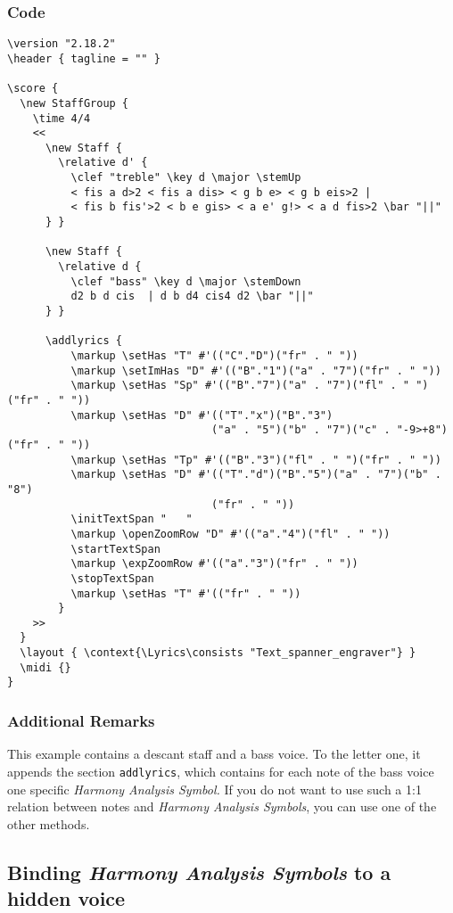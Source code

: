 \documentclass[
  DIV=calc,
  BCOR=5mm,
  12pt,
  headings=small,
  oneside,
  abstract=true,
  toc=bib,
  xcolor=dvipsnames,
  openany,
  ngerman,english]{scrartcl}
\newcommand{\has}[1]{\textit{Harmony Analysis Symbol#1}}
\begin{document}
\subsubsection{Code}

\begin{scriptsize}
\begin{verbatim}
\version "2.18.2"
\header { tagline = "" }

\score {
  \new StaffGroup {
    \time 4/4
    <<
      \new Staff {
        \relative d' {
          \clef "treble" \key d \major \stemUp
          < fis a d>2 < fis a dis> < g b e> < g b eis>2 | 
          < fis b fis'>2 < b e gis> < a e' g!> < a d fis>2 \bar "||"
      } }   

      \new Staff {
        \relative d { 
          \clef "bass" \key d \major \stemDown
          d2 b d cis  | d b d4 cis4 d2 \bar "||"
      } }   
      
      \addlyrics {
          \markup \setHas "T" #'(("C"."D")("fr" . " "))
          \markup \setImHas "D" #'(("B"."1")("a" . "7")("fr" . " "))
          \markup \setHas "Sp" #'(("B"."7")("a" . "7")("fl" . " ")("fr" . " "))
          \markup \setHas "D" #'(("T"."x")("B"."3")
                                ("a" . "5")("b" . "7")("c" . "-9>+8")("fr" . " "))
          \markup \setHas "Tp" #'(("B"."3")("fl" . " ")("fr" . " ")) 
          \markup \setHas "D" #'(("T"."d")("B"."5")("a" . "7")("b" . "8")
                                ("fr" . " "))    
          \initTextSpan "   "
          \markup \openZoomRow "D" #'(("a"."4")("fl" . " "))
          \startTextSpan
          \markup \expZoomRow #'(("a"."3")("fr" . " ")) 
          \stopTextSpan
          \markup \setHas "T" #'(("fr" . " "))
        }
    >>
  }
  \layout { \context{\Lyrics\consists "Text_spanner_engraver"} }
  \midi {}
}
\end{verbatim}
\end{scriptsize}

\subsubsection{Additional Remarks}

This example contains a descant staff and a bass voice. To the letter one, it
appends the section \texttt{addlyrics}, which contains for each note of the bass
voice one specific \has. If you do not want to use such a 1:1 relation between
notes and \has{s}, you can use one of the other methods.

\subsection{Binding \has{s} to a hidden voice}
\end{document}
